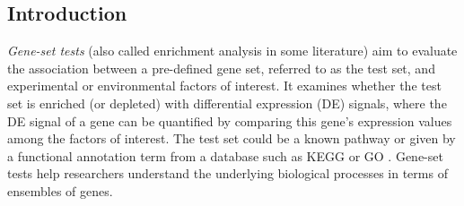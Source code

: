 	\subsection{Introduction}\label{section:introduction}
	
	\textit{Gene-set tests} (also called enrichment 
	analysis in some literature) aim to evaluate  the association between a pre-defined gene set, 
	referred to as the test set, and experimental or environmental factors of interest.
    It examines whether the test set is enriched (or depleted) with differential expression (DE) 
    signals, where the DE signal of a gene can be quantified by comparing this gene's expression 
    values among the factors of interest. The test set could be a known pathway or given by a 
    functional annotation term from a database such as KEGG\citep{kanehisa2000kegg} or GO 
    \citep{ashburner2000gene}.
	Gene-set tests help researchers understand the underlying biological processes in terms of 
	ensembles of genes.
	

